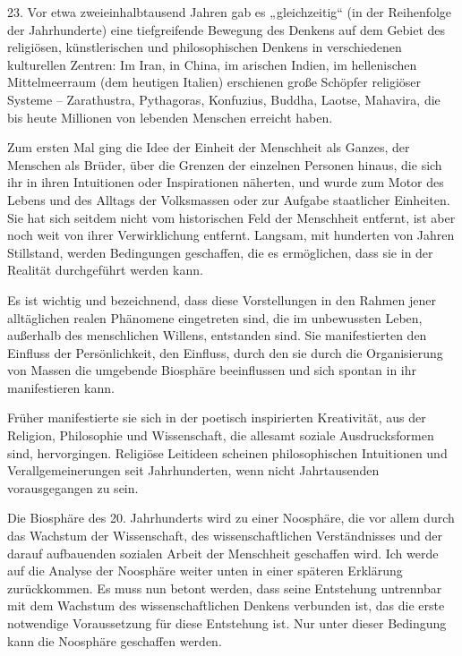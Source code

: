 \documentclass[11pt,a4paper]{book}
\begin{document}
23. Vor etwa zweieinhalbtausend Jahren gab es „gleichzeitig“ (in der Reihenfolge der Jahrhunderte) eine tiefgreifende Bewegung des Denkens auf dem Gebiet des religiösen, künstlerischen und philosophischen Denkens in verschiedenen kulturellen Zentren: Im Iran, in China, im arischen Indien, im hellenischen Mittelmeerraum (dem heutigen Italien) erschienen große Schöpfer religiöser Systeme -- Zarathustra, Pythagoras, Konfuzius, Buddha, Laotse, Mahavira, die bis heute Millionen von lebenden Menschen erreicht haben. 

Zum ersten Mal ging die Idee der Einheit der Menschheit als Ganzes, der Menschen als Brüder, über die Grenzen der einzelnen Personen hinaus, die sich ihr in ihren Intuitionen oder Inspirationen näherten, und wurde zum Motor des Lebens und des Alltags der Volksmassen oder zur Aufgabe staatlicher Einheiten. Sie hat sich seitdem nicht vom historischen Feld der Menschheit entfernt, ist aber noch weit von ihrer Verwirklichung entfernt. Langsam, mit hunderten von Jahren Stillstand, werden Bedingungen geschaffen, die es ermöglichen, dass sie in der Realität durchgeführt werden kann. 

Es ist wichtig und bezeichnend, dass diese Vorstellungen in den Rahmen jener alltäglichen realen Phänomene eingetreten sind, die im unbewussten Leben, außerhalb des menschlichen Willens, entstanden sind. Sie manifestierten den Einfluss der Persönlichkeit, den Einfluss, durch den sie durch die Organisierung von Massen die umgebende Biosphäre beeinflussen und sich spontan in ihr manifestieren kann. 

Früher manifestierte sie sich in der poetisch inspirierten Kreativität, aus der Religion, Philosophie und Wissenschaft, die allesamt soziale Ausdrucksformen sind, hervorgingen. Religiöse Leitideen scheinen philosophischen Intuitionen und Verallgemeinerungen seit Jahrhunderten, wenn nicht Jahrtausenden vorausgegangen zu sein. 

Die Biosphäre des 20. Jahrhunderts wird zu einer Noosphäre, die vor allem durch das Wachstum der Wissenschaft, des wissenschaftlichen Verständnisses und der darauf aufbauenden sozialen Arbeit der Menschheit geschaffen wird. Ich werde auf die Analyse der Noosphäre weiter unten in einer späteren Erklärung zurückkommen. Es muss nun betont werden, dass seine Entstehung untrennbar mit dem Wachstum des wissenschaftlichen Denkens verbunden ist, das die erste notwendige Voraussetzung für diese Entstehung ist. Nur unter dieser Bedingung kann die Noosphäre geschaffen werden. 
\end{document}
